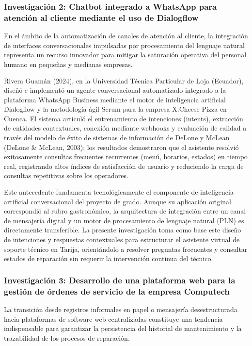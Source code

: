 \subsubsection*{Investigación 2: Chatbot integrado a WhatsApp para atención al cliente mediante el uso de Dialogflow}

En el ámbito de la automatización de canales de atención al cliente, la integración de interfaces conversacionales impulsadas por procesamiento del lenguaje natural representa un recurso innovador para mitigar la saturación operativa del personal humano en pequeñas y medianas empresas.

Rivera Guamán (2024), en la Universidad Técnica Particular de Loja (Ecuador), diseñó e implementó un agente conversacional automatizado integrado a la plataforma WhatsApp Business mediante el motor de inteligencia artificial Dialogflow y la metodología ágil Scrum para la empresa X.Cheese Pizza en Cuenca. El sistema articuló el entrenamiento de intenciones (intents), extracción de entidades contextuales, conexión mediante webhooks y evaluación de calidad a través del modelo de éxito de sistemas de información de DeLone y McLean (DeLone \& McLean, 2003); los resultados demostraron que el asistente resolvió exitosamente consultas frecuentes recurrentes (menú, horarios, estados) en tiempo real, registrando altos índices de satisfacción de usuario y reduciendo la carga de consultas repetitivas sobre los operadores.

Este antecedente fundamenta tecnológicamente el componente de inteligencia artificial conversacional del proyecto de grado. Aunque su aplicación original correspondió al rubro gastronómico, la arquitectura de integración entre un canal de mensajería digital y un motor de procesamiento de lenguaje natural (PLN) es directamente transferible. La presente investigación toma como base este diseño de intenciones y respuestas contextuales para estructurar el asistente virtual de soporte técnico en Tarija, orientándolo a resolver preguntas frecuentes y consultar estados de reparación sin requerir la intervención continua del técnico.

\subsubsection*{Investigación 3: Desarrollo de una plataforma web para la gestión de órdenes de servicio de la empresa Computech}

La transición desde registros informales en papel o mensajería desestructurada hacia plataformas de software web centralizadas constituye una tendencia indispensable para garantizar la persistencia del historial de mantenimiento y la trazabilidad de los procesos de reparación.

